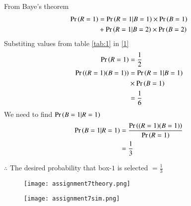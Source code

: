 \documentclass[journal,12pt,twocolumn]{IEEEtran}
\begin{document}
From Baye's theorem
\begin{align}
\Pr\left(R=1\right)&=\Pr\left(R=1|B=1\right) \times \Pr\left(B=1\right) \notag \\
 & +\Pr\left(R=1|B=2\right) \times \Pr\left(B=2\right)  \label{1}
 \end{align}
Substiting values from table \eqref{tab:1} in \eqref{1}
\begin{align}
\Pr\left(R=1\right) &=\frac{1}{2} \label{2} \\
\Pr\left((R=1)(B=1)\right)&=\Pr\left(R=1|B=1\right)\notag \\
&  \times \Pr\left(B=1\right) \\ 
&= \frac{1}{6}  \label{3}
\end{align}
We need to find $\Pr\left(B=1|R=1\right)$ \\
\begin{align}
\Pr\left(B=1|R=1\right) &= \frac{\Pr\left((R=1 ) (B=1)\right)}{\Pr\left(R=1\right)} \\
&=\frac{1}{3}
\end{align}

 $\therefore$ The desired probability that box-$1$ is selected $= \frac{1}{3}$ \\
 

 
\begin{figure}[htb!]
\begin{center}
\texttt{[image: assignment7theory.png]}
\end{center}
\end{figure}

\begin{figure}[htb!]
\begin{center}
\texttt{[image: assignment7sim.png]}
\end{center}
\end{figure}
\end{document}
